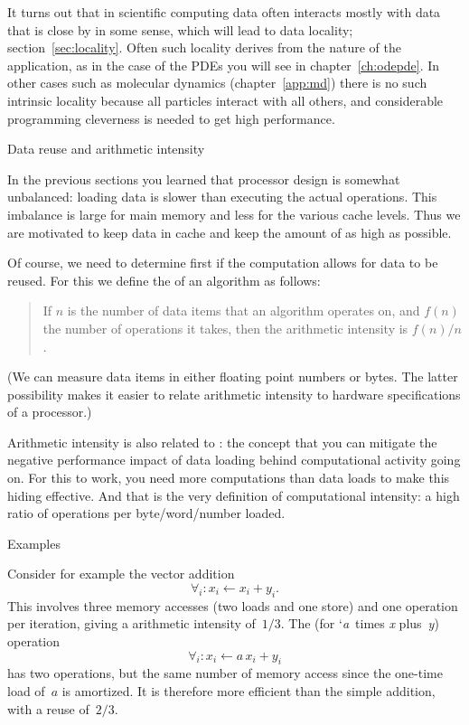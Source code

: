 It turns out that in scientific computing data often
interacts mostly with data that is close by in some sense, which will
lead to data locality; section~\ref{sec:locality}. Often such locality
derives from the nature of the application, as in the case of the \acp{PDE} you
will see in chapter~\ref{ch:odepde}. In other cases such as molecular
dynamics (chapter~\ref{app:md}) there is no such intrinsic locality
because all particles interact with all others,
and considerable programming cleverness is needed to get high performance.

 {Data reuse and arithmetic intensity}
\label{sec:reuse}
\label{sec:gemm}
\label{sec:intensity}

In the previous sections you learned that processor design is somewhat unbalanced:
loading data is slower than executing the actual operations.
This imbalance is large for main memory and less for the various cache levels.
Thus we are motivated to keep data in cache and 
keep the amount of   as high as possible.

Of course, we need to determine first if the computation allows for data to be
reused.
For this we define the  
of an algorithm as follows:
\begin{quote}
  If $n$ is the number of data items that an algorithm operates on, and
  $f(n)$ the number of operations it takes, then the arithmetic intensity is
  $f(n)/n$.
\end{quote}
(We can measure data items in either floating point numbers or bytes.
The latter possibility makes it easier to relate arithmetic intensity
to hardware specifications of a processor.)

Arithmetic intensity is also related to :
the concept that you can mitigate the negative performance impact
of data loading
behind computational activity going on.
%
For this to work, you need more computations than data loads to make
this hiding effective. And that is the very definition of
computational intensity: a high ratio of operations per
byte/word/number loaded.

 {Examples}

Consider for example the vector addition 
\[ \forall_i\colon x_i\leftarrow x_i+y_i.
\]
This involves three memory accesses (two loads and one store) 
and one operation per iteration,
giving a arithmetic intensity of~$1/3$. The  (for
`\emph{a}~times \emph{x} plus~\emph{y}) operation 
\[ \forall_i\colon x_i\leftarrow a\,x_i+ y_i
\]
has
two operations, but the same number of memory access since the
one-time load of~$a$ is amortized. It is therefore more efficient
than the simple addition, with a reuse of~$2/3$.

